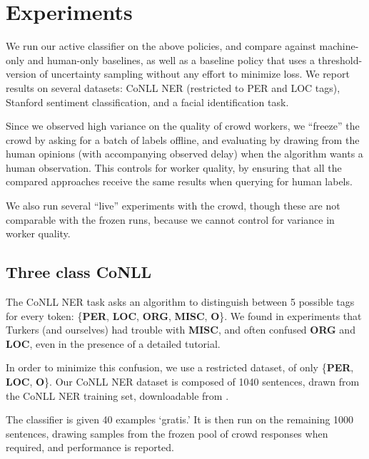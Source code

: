 \section{Experiments}
\label{sec:experiments}

We run our active classifier on the above policies, and compare against machine-only and human-only baselines, as well as a baseline policy that uses a threshold-version of uncertainty sampling without any effort to minimize loss.
We report results on several datasets: CoNLL NER (restricted to PER and LOC tags), Stanford sentiment classification, and a facial identification task.

Since we observed high variance on the quality of crowd workers, we ``freeze'' the crowd by asking for a batch of labels offline, and evaluating by drawing from the human opinions (with accompanying observed delay) when the algorithm wants a human observation.
This controls for worker quality, by ensuring that all the compared approaches receive the same results when querying for human labels.

We also run several ``live'' experiments with the crowd, though these are not comparable with the frozen runs, because we cannot control for variance in worker quality.

\subsection{Three class CoNLL}

The CoNLL NER task asks an algorithm to distinguish between 5 possible tags for every token: \{\textbf{PER}, \textbf{LOC}, \textbf{ORG}, \textbf{MISC}, \textbf{O}\}.
We found in experiments that Turkers (and ourselves) had trouble with \textbf{MISC}, and often confused \textbf{ORG} and \textbf{LOC}, even in the presence of a detailed tutorial.

In order to minimize this confusion, we use a restricted dataset, of only \{\textbf{PER}, \textbf{LOC}, \textbf{O}\}.
Our CoNLL NER dataset is composed of 1040 sentences, drawn from the CoNLL NER training set, downloadable from .

The classifier is given 40 examples `gratis.' It is then run on the remaining 1000 sentences, drawing samples from the frozen pool of crowd responses when required, and performance is reported.

